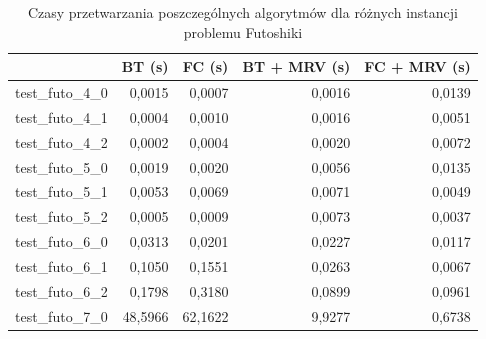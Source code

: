 \documentclass{article}
\begin{document}
	\begin{table}[H]
		\caption{Czasy przetwarzania poszczególnych algorytmów dla różnych instancji problemu Futoshiki}
		\label{tab:times_futo}
		\begin{center}
			\begin{tabular}{|l|r|r|r|r|}
				\hline
				& \multicolumn{1}{c|}{\textbf{BT (s)}} & \multicolumn{1}{c|}{\textbf{FC (s)}} & \multicolumn{1}{c|}{\textbf{BT + MRV (s)}} & \multicolumn{1}{c|}{\textbf{FC + MRV (s)}} \\ \hline
				test\_futo\_4\_0 & 0,0015                           & 0,0007                           & 0,0016                                 & 0,0139                                 \\ \hline
				test\_futo\_4\_1 & 0,0004                           & 0,0010                           & 0,0016                                 & 0,0051                                 \\ \hline
				test\_futo\_4\_2 & 0,0002                           & 0,0004                           & 0,0020                                 & 0,0072                                 \\ \hline
				test\_futo\_5\_0 & 0,0019                           & 0,0020                           & 0,0056                                 & 0,0135                                 \\ \hline
				test\_futo\_5\_1 & 0,0053                           & 0,0069                           & 0,0071                                 & 0,0049                                 \\ \hline
				test\_futo\_5\_2 & 0,0005                           & 0,0009                           & 0,0073                                 & 0,0037                                 \\ \hline
				test\_futo\_6\_0 & 0,0313                           & 0,0201                           & 0,0227                                 & 0,0117                                 \\ \hline
				test\_futo\_6\_1 & 0,1050                           & 0,1551                           & 0,0263                                 & 0,0067                                 \\ \hline
				test\_futo\_6\_2 & 0,1798                           & 0,3180                           & 0,0899                                 & 0,0961                                 \\ \hline
				test\_futo\_7\_0 & 48,5966                          & 62,1622                          & 9,9277                                 & 0,6738                                 \\ \hline

\end{tabular}
\end{center}
\end{table}
\end{document}
